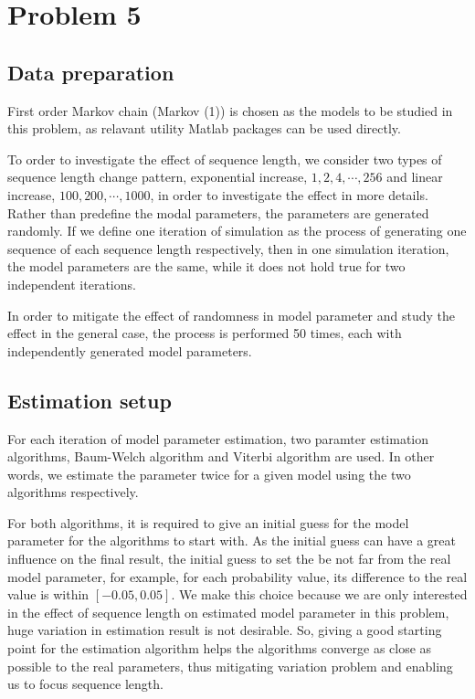 \documentclass[paper=a4, fontsize=11pt]{scrartcl} %
\numberwithin{equation}{section} %
\numberwithin{figure}{section} %
\numberwithin{table}{section} %
\begin{document}
\section {Problem 5}
\subsection {Data preparation}
First order Markov chain (Markov (1)) is chosen as the models to be studied in this problem, as relavant utility Matlab packages can be used directly.

To order to investigate the effect of sequence length, we consider two types of sequence length change pattern, exponential increase, $1, 2, 4, \cdots, 256$ and linear increase, $100, 200, \cdots, 1000$, in order to investigate the effect in more details. Rather than predefine the modal parameters, the parameters are generated randomly. If we define one iteration of simulation as the process of generating one sequence of each sequence length respectively, then in one simulation iteration, the model parameters are the same, while it does not hold true for two independent iterations.

In order to mitigate the effect of randomness in model parameter and study the effect in the general case, the process is performed 50 times, each with independently generated model parameters.

\subsection {Estimation setup}

For each iteration of model parameter estimation, two paramter estimation algorithms, Baum-Welch algorithm and Viterbi algorithm are used. In other words, we estimate the parameter twice for a given model using the two algorithms respectively.

For both algorithms, it is required to give an initial guess for the model parameter for the algorithms to start with. As the initial guess can have a great influence on the final result, the initial guess to set the be not far from the real model parameter, for example, for each probability value, its difference to the real value is within $[-0.05, 0.05]$. We make this choice because we are only interested in the effect of sequence length on estimated model parameter in this problem, huge variation in estimation result is not desirable. So,  giving a good starting point for the estimation algorithm helps the algorithms converge as close as possible to the real parameters, thus mitigating variation problem and enabling us to focus sequence length.
\end{document}
